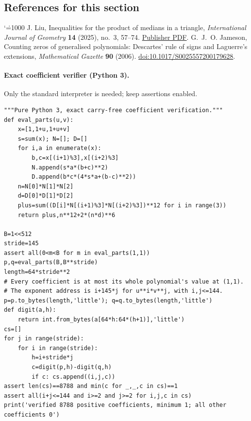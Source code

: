 \documentclass[11pt,a4paper]{article}
\makeatletter
\numberwithin{equation}{section}
\theoremstyle{definition}
\theoremstyle{remark}
\renewenvironment{thebibliography}[1]
 {\subsection*{References for this section}\small
  \list{\@biblabel{\@arabic\c@enumiv}}
       {\settowidth\labelwidth{\@biblabel{#1}}\leftmargin\labelwidth
        \advance\leftmargin\labelsep\@openbib@code
        \usecounter{enumiv}\let\p@enumiv\@empty
        \renewcommand\theenumiv{\@arabic\c@enumiv}}
  \sloppy\clubpenalty4000\widowpenalty4000\sfcode`\.=1000\relax}
 {\def\@noitemerr{\@latex@warning{Empty bibliography}}\endlist}
\makeatother
\begin{document}
\begin{thebibliography}{9}
 J. Liu, Inequalities for the product of medians in a triangle, \emph{International Journal of Geometry} \textbf{14} (2025), no.~3, 57--74. \href{https://ijgeometry.com/wp-content/uploads/2025/06/5.-57-74.pdf}{Publisher PDF}.
 G.~J.~O. Jameson, Counting zeros of generalised polynomials: Descartes' rule of signs and Laguerre's extensions, \emph{Mathematical Gazette} \textbf{90} (2006). \href{https://doi.org/10.1017/S0025557200179628}{doi:10.1017/S0025557200179628}.
\end{thebibliography}

\paragraph{Exact coefficient verifier (Python 3).} Only the standard interpreter is needed; keep assertions enabled.
\begingroup\fontsize{8}{9.7}\selectfont
\begin{Verbatim}
"""Pure Python 3, exact carry-free coefficient verification."""
def eval_parts(u,v):
    x=[1,1+u,1+u+v]
    s=sum(x); N=[]; D=[]
    for i,a in enumerate(x):
        b,c=x[(i+1)%3],x[(i+2)%3]
        N.append(s*a*(b+c)**2)
        D.append(b*c*(4*s*a+(b-c)**2))
    n=N[0]*N[1]*N[2]
    d=D[0]*D[1]*D[2]
    plus=sum((D[i]*N[(i+1)%3]*N[(i+2)%3])**12 for i in range(3))
    return plus,n**12+2*(n*d)**6

B=1<<512
stride=145
assert all(0<m<B for m in eval_parts(1,1))
p,q=eval_parts(B,B**stride)
length=64*stride**2
# Every coefficient is at most its whole polynomial's value at (1,1).
# The exponent address is i+145*j for u**i*v**j, with i,j<=144.
p=p.to_bytes(length,'little'); q=q.to_bytes(length,'little')
def digit(a,h):
    return int.from_bytes(a[64*h:64*(h+1)],'little')
cs=[]
for j in range(stride):
    for i in range(stride):
        h=i+stride*j
        c=digit(p,h)-digit(q,h)
        if c: cs.append((i,j,c))
assert len(cs)==8788 and min(c for _,_,c in cs)==1
assert all(i+j<=144 and i>=2 and j>=2 for i,j,c in cs)
print('verified 8788 positive coefficients, minimum 1; all other coefficients 0')
\end{Verbatim}
\endgroup

\par\endgroup

\begingroup
\newcommand{\ee}{\mathrm e}
\end{document}
